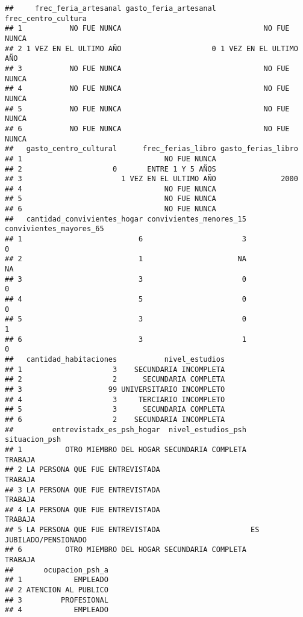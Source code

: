 \documentclass[
]{article}
\begin{document}
\begin{verbatim}
##     frec_feria_artesanal gasto_feria_artesanal    frec_centro_cultura
## 1           NO FUE NUNCA                                 NO FUE NUNCA
## 2 1 VEZ EN EL ULTIMO AÑO                     0 1 VEZ EN EL ULTIMO AÑO
## 3           NO FUE NUNCA                                 NO FUE NUNCA
## 4           NO FUE NUNCA                                 NO FUE NUNCA
## 5           NO FUE NUNCA                                 NO FUE NUNCA
## 6           NO FUE NUNCA                                 NO FUE NUNCA
##   gasto_centro_cultural      frec_ferias_libro gasto_ferias_libro
## 1                                 NO FUE NUNCA                   
## 2                     0       ENTRE 1 Y 5 AÑOS                   
## 3                       1 VEZ EN EL ULTIMO AÑO               2000
## 4                                 NO FUE NUNCA                   
## 5                                 NO FUE NUNCA                   
## 6                                 NO FUE NUNCA                   
##   cantidad_convivientes_hogar convivientes_menores_15 convivientes_mayores_65
## 1                           6                       3                       0
## 2                           1                      NA                      NA
## 3                           3                       0                       0
## 4                           5                       0                       0
## 5                           3                       0                       1
## 6                           3                       1                       0
##   cantidad_habitaciones           nivel_estudios
## 1                     3    SECUNDARIA INCOMPLETA
## 2                     2      SECUNDARIA COMPLETA
## 3                    99 UNIVERSITARIO INCOMPLETO
## 4                     3     TERCIARIO INCOMPLETO
## 5                     3      SECUNDARIA COMPLETA
## 6                     2    SECUNDARIA INCOMPLETA
##         entrevistadx_es_psh_hogar  nivel_estudios_psh          situacion_psh
## 1          OTRO MIEMBRO DEL HOGAR SECUNDARIA COMPLETA                TRABAJA
## 2 LA PERSONA QUE FUE ENTREVISTADA                                    TRABAJA
## 3 LA PERSONA QUE FUE ENTREVISTADA                                    TRABAJA
## 4 LA PERSONA QUE FUE ENTREVISTADA                                    TRABAJA
## 5 LA PERSONA QUE FUE ENTREVISTADA                     ES JUBILADO/PENSIONADO
## 6          OTRO MIEMBRO DEL HOGAR SECUNDARIA COMPLETA                TRABAJA
##       ocupacion_psh_a
## 1            EMPLEADO
## 2 ATENCION AL PUBLICO
## 3         PROFESIONAL
## 4            EMPLEADO

\end{verbatim}
\end{document}
